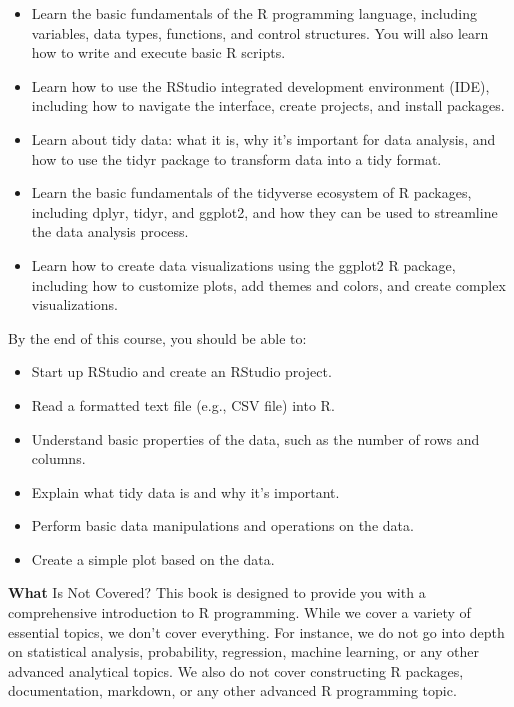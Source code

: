 \documentclass[
]{book}
\begin{document}
\begin{itemize}
\item
  Learn the basic fundamentals of the R programming language, including variables, data types, functions, and control structures. You will also learn how to write and execute basic R scripts.
\item
  Learn how to use the RStudio integrated development environment (IDE), including how to navigate the interface, create projects, and install packages.
\item
  Learn about tidy data: what it is, why it's important for data analysis, and how to use the tidyr package to transform data into a tidy format.
\item
  Learn the basic fundamentals of the tidyverse ecosystem of R packages, including dplyr, tidyr, and ggplot2, and how they can be used to streamline the data analysis process.
\item
  Learn how to create data visualizations using the ggplot2 R package, including how to customize plots, add themes and colors, and create complex visualizations.
\end{itemize}

By the end of this course, you should be able to:

\begin{itemize}
\item
  Start up RStudio and create an RStudio project.
\item
  Read a formatted text file (e.g., CSV file) into R.
\item
  Understand basic properties of the data, such as the number of rows and columns.
\item
  Explain what tidy data is and why it's important.
\item
  Perform basic data manipulations and operations on the data.
\item
  Create a simple plot based on the data.
\end{itemize}

\textbf{What} Is Not Covered? This book is designed to provide you with a comprehensive introduction to R programming. While we cover a variety of essential topics, we don't cover everything. For instance, we do not go into depth on statistical analysis, probability, regression, machine learning, or any other advanced analytical topics. We also do not cover constructing R packages, documentation, markdown, or any other advanced R programming topic.
\end{document}
